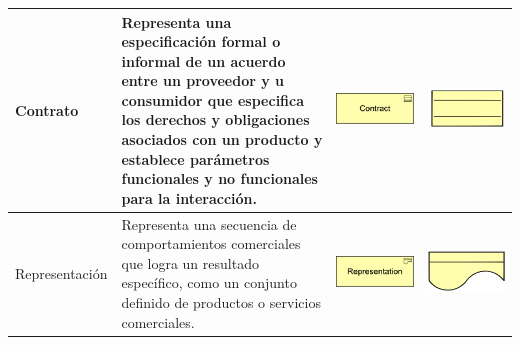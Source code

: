 \begin{longtable}{|p{0.15\linewidth}|p{0.45\linewidth}|p{0.2\linewidth} p{0.2\linewidth}|}
    Contrato
    &
    Representa una especificación formal o informal de un acuerdo entre un proveedor y u consumidor que especifica los derechos y obligaciones asociados con un producto y establece parámetros funcionales y no funcionales para la interacción.
    &
\begin{center}
    \includegraphics[width=1\linewidth]{imgs/capa_de_negocios/11.pdf}
\end{center} &
\begin{center}
    \includegraphics[width=0.5\linewidth]{imgs/capa_de_negocios/a11.pdf}
\end{center}
    \\ \hline

    Representación
    &
    Representa una secuencia de comportamientos comerciales que logra un resultado específico, como un conjunto definido de productos o servicios comerciales.
    &
\begin{center}
    \includegraphics[width=1\linewidth]{imgs/capa_de_negocios/12.pdf}
\end{center} &
\begin{center}
    \includegraphics[width=0.5\linewidth]{imgs/capa_de_negocios/a12.pdf}
\end{center}
    \\ \hline


\end{longtable}
